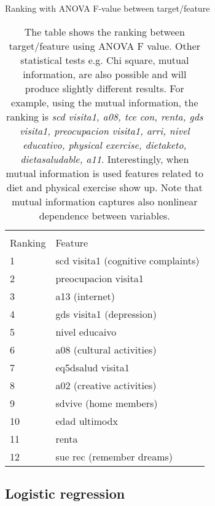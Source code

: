 \documentclass[11pt]{article}
\theoremstyle{definition}
\theoremstyle{remark}
\begin{document}
\begin{table}[H]
\caption{Ranking with ANOVA F-value between target/feature} \label{tab:ranking} 
\begin{center} 
\begin{tabular}{ll}
\hline
\multicolumn{1}{c}{} \\
Ranking & Feature     \\
\hline
1 & scd visita1 (cognitive complaints)         \\
2 & preocupacion visita1 \\
3 & a13 (internet) \\
4 & gds visita1 (depression)\\
5 & nivel educaivo \\
6 & a08 (cultural activities)\\
7 & eq5dsalud visita1 \\
8 & a02 (creative activities) \\
9 & sdvive (home members)\\
10 & edad ultimodx \\
11 & renta \\
12 & sue rec (remember dreams) \\
\hline
\end{tabular}
\caption{The table shows the ranking between target/feature using ANOVA F value. Other statistical tests e.g. Chi square, mutual information, are also possible and will produce slightly different results. For example, using the mutual information, the ranking is \emph{scd visita1, a08, tce con, renta, gds visita1, preocupacion visita1, arri, nivel educativo, physical exercise, dietaketo, dietasaludable, a11}. Interestingly, when mutual information is used features related to diet and physical exercise show up. Note that mutual information captures also nonlinear dependence between variables.}
\end{center}
\end{table}



\subsection{Logistic regression}
\label{se:reslogreg}
\end{document}
